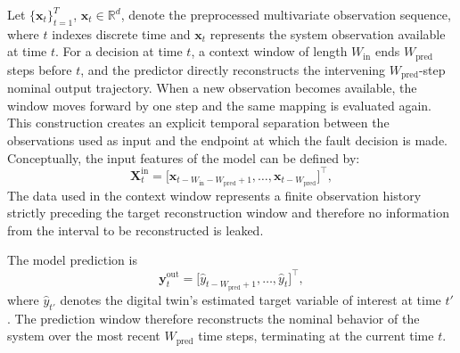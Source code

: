\documentclass[a4paper,10pt]{cas-sc}%
\newcommand{\rev}[1]{#1}
\begin{document}
Let $\{\boldsymbol{x}_t\}_{t=1}^{T}$, $\boldsymbol{x}_t \in \mathbb{R}^d$, denote the preprocessed multivariate observation sequence, where $t$ indexes discrete time and $\boldsymbol{x}_t$ represents the system observation available at time $t$. \rev{For a decision at time $t$, a context window of length $W_{\mathrm{in}}$ ends $W_{\mathrm{pred}}$ steps before $t$, and the predictor directly reconstructs the intervening $W_{\mathrm{pred}}$-step nominal output trajectory. When a new observation becomes available, the window moves forward by one step and the same mapping is evaluated again. This construction creates an explicit temporal separation between the observations used as input and the endpoint at which the fault decision is made.} Conceptually, the input features of the model can be defined by:
\begin{equation}
	\boldsymbol{X}_t^{\mathrm{in}}
	=
	\big[
	\boldsymbol{x}_{t-W_{\mathrm{in}}-W_{\mathrm{pred}}+1},
	\ldots,
	\boldsymbol{x}_{t-W_{\mathrm{pred}}}
	\big]^\top ,
	\label{eq:input_features}
\end{equation}
The data used in the context window represents a finite observation history strictly preceding the target reconstruction window and therefore no information from the interval to be reconstructed is leaked.

The model prediction is
\begin{equation}
	\boldsymbol{y}_t^{\mathrm{out}}
	=
	\big[
	\hat{y}_{t-W_{\mathrm{pred}}+1},
	\ldots,
	\hat{y}_t
	\big]^\top,
	\label{eq:output_features}
\end{equation}
where $\hat{y}_{t'}$ denotes the digital twin's estimated target variable of interest at time $t'$. The prediction window therefore reconstructs the nominal behavior of the system over the most recent $W_{\mathrm{pred}}$ time steps, terminating at the current time $t$.
\end{document}
